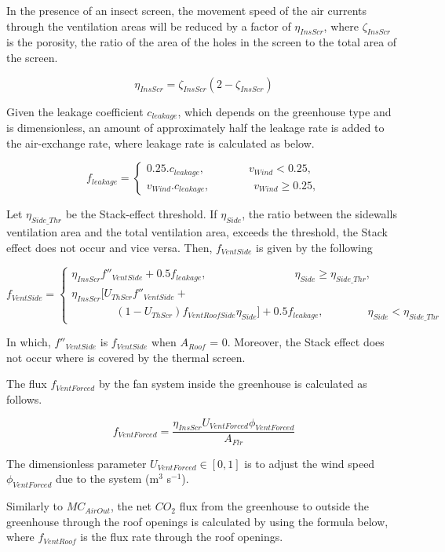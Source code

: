 \documentclass[a4paper]{article}
\begin{document}
In the presence of an insect screen, the movement speed of the air currents through the ventilation areas will be reduced by a factor of $\eta_{InsScr}$, where $\zeta_{InsScr}$ is the porosity, the ratio of the area of the holes in the screen to the total area of the screen.

$$ \eta_{InsScr} = \zeta_{InsScr} (2 -  \zeta_{InsScr})$$

Given the leakage coefficient $c_{leakage}$, which depends on the greenhouse type and is dimensionless, an amount of approximately half the leakage rate is added to the air-exchange rate, where leakage rate is calculated as below.

$$ f_{leakage} = \begin{cases}
    0.25 . c_{leakage}, \qquad \qquad v_{Wind} < 0.25, \\
    v_{Wind} . c_{leakage}, \qquad \qquad v_{Wind} \geq 0.25,
  \end{cases}$$

Let $\eta_{Side\_Thr}$ be the Stack-effect threshold. If $\eta_{Side}$, the ratio between the sidewalls ventilation
area and the total ventilation area, exceeds the threshold, the Stack effect does not occur and vice versa. Then, $f_{VentSide}$ is given by the following

$$ f_{VentSide} = \begin{cases}
    \eta_{InsScr} f''_{VentSide} + 0.5f_{leakage},  \qquad \qquad \qquad \qquad \eta_{Side} \geq \eta_{Side\_Thr} , \\
    \eta_{InsScr} [U_{ThScr}f''_{VentSide} +                                                                        \\
    \qquad \qquad (1-U_{ThScr})f_{VentRoofSide} \eta_{Side} ] + 0.5 f_{leakage},  \qquad \qquad \eta_{Side} < \eta_{Side\_Thr}
  \end{cases}$$

In which,  $f''_{VentSide}$ is  $f_{VentSide}$ when $A_{Roof}$ = 0. Moreover, the Stack effect does not occur where is covered by the thermal screen.

The flux $f_{VentForced}$ by the fan system inside the greenhouse is calculated as follows.

$$f_{VentForced} = \frac{\eta_{InsScr} U_{VentForced} \phi_{VentForced} } {A_{Flr}}$$

The dimensionless parameter $U_{VentForced} \in [0,1]$ is to adjust the wind speed $\phi_{VentForced}$ due to
the system (m$^3$ s$^{-1}$).

Similarly to $MC_{AirOut}$, the net $CO_2$ flux from the greenhouse to outside the greenhouse through the roof openings is calculated by using the formula below, where $f_{VentRoof}$ is the flux rate through the roof openings.
\end{document}
